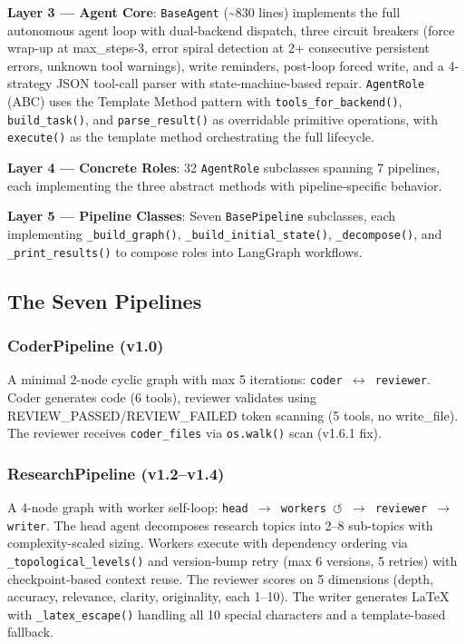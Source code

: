 \textbf{Layer 3 --- Agent Core}: \texttt{BaseAgent} (\textasciitilde830 lines) implements the full autonomous agent loop \cite{react,got} with dual-backend dispatch, three circuit breakers (force wrap-up at max\_steps-3, error spiral detection at 2+ consecutive persistent errors, unknown tool warnings), write reminders, post-loop forced write, and a 4-strategy JSON tool-call parser with state-machine-based repair. \texttt{AgentRole} (ABC) uses the Template Method pattern \cite{designpatterns} with \texttt{tools\_for\_backend()}, \texttt{build\_task()}, and \texttt{parse\_result()} as overridable primitive operations, with \texttt{execute()} as the template method orchestrating the full lifecycle.

\textbf{Layer 4 --- Concrete Roles}: 32 \texttt{AgentRole} subclasses spanning 7 pipelines, each implementing the three abstract methods with pipeline-specific behavior.

\textbf{Layer 5 --- Pipeline Classes}: Seven \texttt{BasePipeline} subclasses, each implementing \texttt{\_build\_graph()}, \texttt{\_build\_initial\_state()}, \texttt{\_decompose()}, and \texttt{\_print\_results()} to compose roles into LangGraph workflows.

\subsection{The Seven Pipelines}

\subsubsection{CoderPipeline (v1.0)}
A minimal 2-node cyclic graph with max 5 iterations: \texttt{coder $\leftrightarrow$ reviewer}. Coder generates code (6 tools), reviewer validates using REVIEW\_PASSED/REVIEW\_FAILED token scanning (5 tools, no write\_file). The reviewer receives \texttt{coder\_files} via \texttt{os.walk()} scan (v1.6.1 fix).

\subsubsection{ResearchPipeline (v1.2--v1.4)}
A 4-node graph with worker self-loop: \texttt{head $\rightarrow$ workers $\circlearrowleft$ $\rightarrow$ reviewer $\rightarrow$ writer}. The head agent decomposes research topics into 2--8 sub-topics with complexity-scaled sizing. Workers execute with dependency ordering via \texttt{\_topological\_levels()} and version-bump retry (max 6 versions, 5 retries) with checkpoint-based context reuse. The reviewer scores on 5 dimensions (depth, accuracy, relevance, clarity, originality, each 1--10). The writer generates LaTeX with \texttt{\_latex\_escape()} handling all 10 special characters and a template-based fallback.


